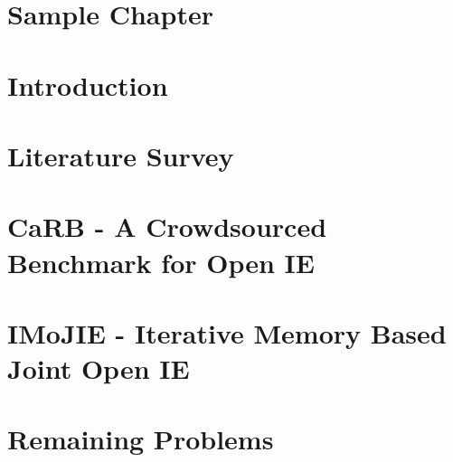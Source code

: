 \documentclass[BTech]{iitddiss}
\begin{document}

\chapter{Sample Chapter}
\label{chap:sample}



\chapter{Introduction}
\label{chap:intro}



\chapter{Literature Survey}
\label{chap:literature_survey}



\chapter{CaRB - A Crowdsourced Benchmark for Open IE}
\label{chap:carb}



\chapter{IMoJIE - Iterative Memory Based Joint Open IE}
\label{chap:imojie}



\chapter{Remaining Problems}
\label{chap:remaining_problems}


\end{document}
